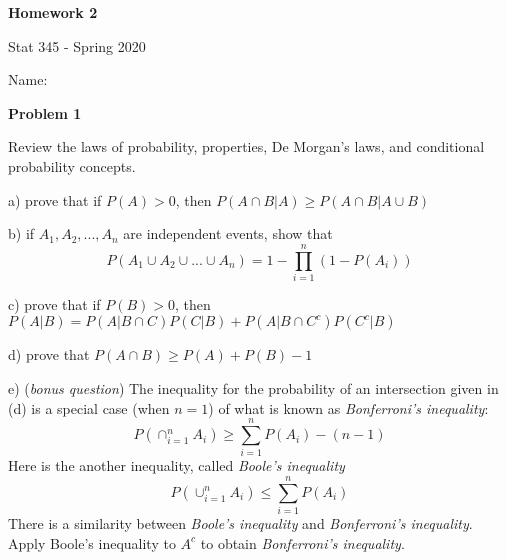 \documentclass[12pt]{article}
\begin{document}
%
\begin{center}
\textbf{Homework 2}
\par
\setlength{\parskip}{1em}

\par
\footnotesize{Stat 345 - Spring 2020}
\par
\hfill\vspace{0.05in}  
\par
Name: \underline{\hspace{3in}}


\end{center}

\begin{flushleft}
\par
\textbf{Problem 1}
\par
\setlength{\parskip}{1em}
\par
Review the laws of probability, properties, De Morgan's laws, and conditional probability concepts. 
\par
	a) prove that if $P(A) > 0$, then $P(A\cap B|A) \geq P(A \cap B | A \cup B)$
\par
\hfill\vspace{0.2in} 
\par

	b) if $A_1, A_2,...,A_n$ are independent events, show that
\[P(A_1\cup A_2\cup ... \cup A_n) = 1 - \prod_{i=1}^{n}(1-P(A_i))\]
\par
\hfill\vspace{0.2in} 
\par

	c) prove that if $P(B) > 0$, then $P(A|B) = P(A|B\cap C)P(C|B) + P(A|B\cap C^c)P(C^c|B)$
\par
\hfill\vspace{0.3in} 
\par

    d) prove that $P(A\cap B) \geq P(A) + P(B) - 1$
\par
\hfill\vspace{0.2in} 
\par

	e) (\textit{bonus question}) The inequality for the probability of an intersection given in (d) is a special case (when $n=1$) of what is known as \textit{Bonferroni's inequality}:
	\[P(\cap_{i=1}^{n} A_i) \geq \sum_{i=1}^{n}P(A_i)-(n-1)\]
	Here is the another inequality, called \textit{Boole's inequality}
	\[P(\cup_{i=1}^{n} A_i) \leq \sum_{i=1}^{n} P(A_i)\] 
	There is a similarity between \textit{Boole's inequality} and \textit{Bonferroni's inequality}. Apply Boole's inequality to $A^c$ to obtain \textit{Bonferroni's inequality}.
	

\end{flushleft}
\end{document}
